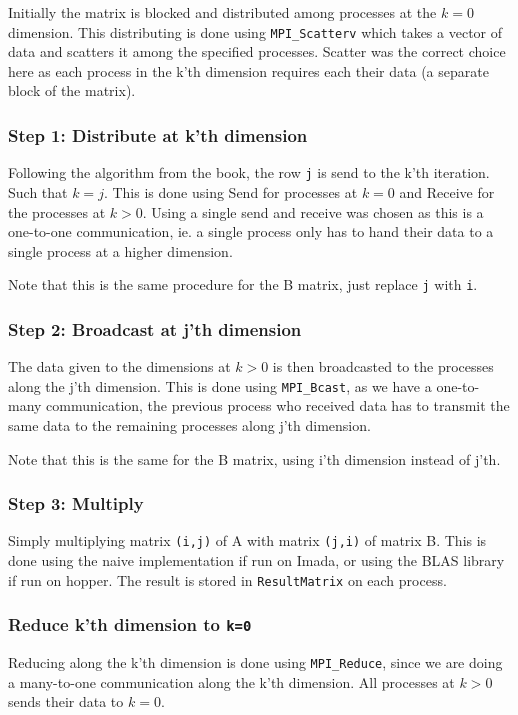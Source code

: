 \documentclass[a4paper,11pt,oneside]{book}
\begin{document}
Initially the matrix is blocked and distributed among processes at the $k=0$ dimension. This distributing is done using \verb!MPI_Scatterv! which takes a vector of data and scatters it among the specified processes. Scatter was the correct choice here as each process in the k'th dimension requires each their data (a separate block of the matrix).

\subsubsection*{Step 1: Distribute at k'th dimension}
Following the algorithm from the book, the row \verb!j! is send to the k'th iteration. Such that $k=j$. This is done using Send for processes at $k=0$ and Receive for the processes at $k>0$. Using a single send and receive was chosen as this is a one-to-one communication, ie. a single process only has to hand their data to a single process at a higher dimension.

Note that this is the same procedure for the B matrix, just replace \verb!j! with \verb!i!.

\subsubsection*{Step 2: Broadcast at j'th dimension}
The data given to the dimensions at $k>0$ is then broadcasted to the processes along the j'th dimension. This is done using \verb!MPI_Bcast!, as we have a one-to-many communication, the previous process who received data has to transmit the same data to the remaining processes along j'th dimension.

Note that this is the same for the B matrix, using i'th dimension instead of j'th.

\subsubsection*{Step 3: Multiply}
Simply multiplying matrix \verb!(i,j)! of A with matrix \verb!(j,i)! of matrix B. This is done using the naive implementation if run on Imada, or using the BLAS library if run on hopper. The result is stored in \verb!ResultMatrix! on each process.

\subsubsection*{Reduce k'th dimension to \verb!k=0!}
Reducing along the k'th dimension is done using \verb!MPI_Reduce!, since we are doing a many-to-one communication along the k'th dimension. All processes at $k>0$ sends their data to $k=0$. 
\end{document}
